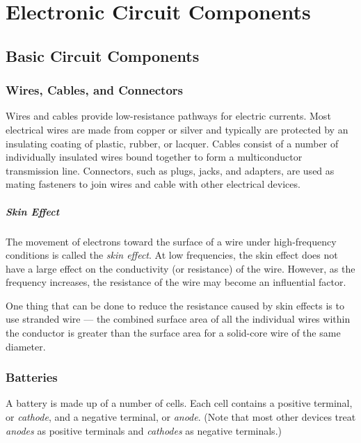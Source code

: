\documentclass[../../document]{subfiles}
\begin{document}
\graphicspath{{images/}}

\chapter{Electronic Circuit Components}
\section{Basic Circuit Components}
\subsection{Wires, Cables, and Connectors}
Wires and cables provide low-resistance pathways for electric currents. Most
electrical wires are made from copper or silver and typically are protected
by an insulating coating of plastic, rubber, or lacquer. Cables consist of a
number of individually insulated wires bound together to form a
multiconductor transmission line. Connectors, such as plugs, jacks, and
adapters, are used as mating fasteners to join wires and cable with other
electrical devices. \cite{practical_electronics}

\paragraph{Skin Effect}
The movement of electrons toward the surface of a wire under high-frequency
conditions is called the \emph{skin effect}. At low frequencies, the skin effect does
not have a large effect on the conductivity (or resistance) of the wire.
However, as the frequency increases, the resistance of the wire may become an
influential factor. \cite{practical_electronics}

One thing that can be done to reduce the resistance caused by skin effects is
to use stranded wire --- the combined surface area of all the individual wires
within the conductor is greater than the surface area for a solid-core wire
of the same diameter. \cite{practical_electronics}

\subsection{Batteries}
A battery is made up of a number of cells. Each cell contains a positive
terminal, or \emph{cathode}, and a negative terminal, or \emph{anode}. (Note
that most other devices treat \emph{anodes} as positive terminals and
\emph{cathodes} as negative terminals.) \cite{practical_electronics}
\end{document}
